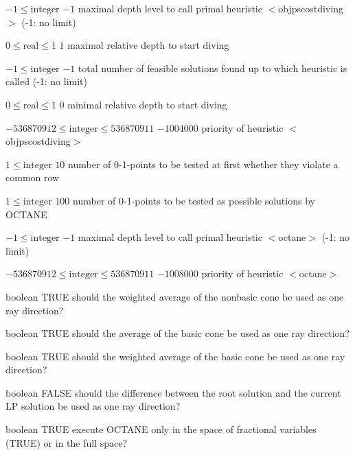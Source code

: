 %
{$-1\leq\textrm{integer}$}%
{$-1$}%
{maximal depth level to call primal heuristic $<$objpscostdiving$>$ (-1: no limit)}%
{}

%
{$0\leq\textrm{real}\leq1$}%
{$1$}%
{maximal relative depth to start diving}%
{}

%
{$-1\leq\textrm{integer}$}%
{$-1$}%
{total number of feasible solutions found up to which heuristic is called (-1: no limit)}%
{}

%
{$0\leq\textrm{real}\leq1$}%
{$0$}%
{minimal relative depth to start diving}%
{}

%
{$-536870912\leq\textrm{integer}\leq536870911$}%
{$-1004000$}%
{priority of heuristic $<$objpscostdiving$>$}%
{}

%
{$1\leq\textrm{integer}$}%
{$10$}%
{number of 0-1-points to be tested at first whether they violate a common row}%
{}

%
{$1\leq\textrm{integer}$}%
{$100$}%
{number of 0-1-points to be tested as possible solutions by OCTANE}%
{}

%
{$-1\leq\textrm{integer}$}%
{$-1$}%
{maximal depth level to call primal heuristic $<$octane$>$ (-1: no limit)}%
{}

%
{$-536870912\leq\textrm{integer}\leq536870911$}%
{$-1008000$}%
{priority of heuristic $<$octane$>$}%
{}

%
{boolean}%
{TRUE}%
{should the weighted average of the nonbasic cone be used as one ray direction?}%
{}

%
{boolean}%
{TRUE}%
{should the average of the basic cone be used as one ray direction?}%
{}

%
{boolean}%
{TRUE}%
{should the weighted average of the basic cone be used as one ray direction?}%
{}

%
{boolean}%
{FALSE}%
{should the difference between the root solution and the current LP solution be used as one ray direction?}%
{}

%
{boolean}%
{TRUE}%
{execute OCTANE only in the space of fractional variables (TRUE) or in the full space?}%
{}

